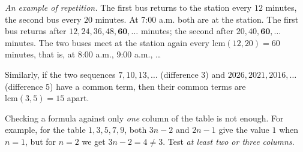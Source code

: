 \documentclass[11pt]{article}
\newenvironment{figC}{\par\vspace{2pt}\begin{center}\begin{tikzpicture}[font=\sffamily\small,>=stealth,line join=round]}%
  {\end{tikzpicture}\end{center}\vspace{1pt}}
\begin{document}
\begin{tipbox}
\emph{An example of repetition.} The first bus returns to the station every $12$ minutes, the second bus every $20$ minutes. At 7:00 a.m. both are at the station.
The first bus returns after $12, 24, 36, 48, \mathbf{60},\dots$ minutes; the second after $20, 40, \mathbf{60},\dots$ minutes.
The two buses meet at the station again every $\text{lcm}(12,20)=60$ minutes, that is, at 8:00 a.m., 9:00 a.m., \dots

Similarly, if the two sequences $7,10,13,\dots$ (difference $3$) and $2026,2021,2016,\dots$ (difference $5$) have a common term, then their common terms are $\text{lcm}(3,5)=15$ apart.
\end{tipbox}


\begin{warnbox}
Checking a formula against only \emph{one} column of the table is not enough. For example, for the table $1,3,5,7,9$, both $3n-2$ and $2n-1$
give the value $1$ when $n=1$, but for $n=2$ we get $3n-2=4\neq 3$. Test \emph{at least two or three columns}.
\end{warnbox}
\end{document}
